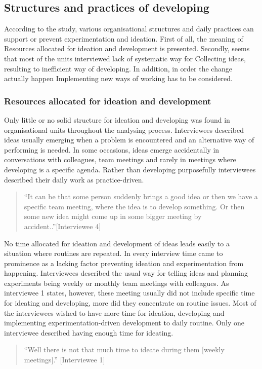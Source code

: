 \subsection{Structures and practices of developing}
According to the study, various organisational structures and daily practices can support or prevent experimentation and ideation. First of all, the meaning of Resources allocated for ideation and development is presented. Secondly, seems that most of the units interviewed lack of systematic way for Collecting ideas, resulting to inefficient way of developing. In addition, in order the change actually happen Implementing new ways of working has to be considered. 

\subsubsection{Resources allocated for ideation and development}
Only little or no solid structure for ideation and developing was found in organisational units throughout the analysing process. Interviewees described ideas usually emerging when a problem is encountered and an alternative way of performing is needed. In some occasions, ideas emerge accidentally  in conversations with colleagues, team meetings and rarely in meetings where developing is a specific agenda. Rather than developing purposefully interviewees described their daily work as practice-driven. 
\begin{quote}
``It can be that some person suddenly brings a good idea or then we have a specific team meeting, where the idea is to develop something. Or then some new idea might come up in some bigger meeting by accident..''[Interviewee 4]
\end{quote}
No time allocated for ideation and development of ideas leads easily to a situation where routines are repeated. In every interview time came to prominence as a lacking factor preventing ideation and experimentation from happening. Interviewees described the usual way for telling ideas and planning experiments being weekly or monthly team meetings with colleagues. As interviewee 1 states, however, these meeting usually did not include specific time for ideating and developing, more did they concentrate on routine issues. Most of the interviewees wished to have more time for ideation, developing and implementing experimentation-driven development to daily routine. Only one interviewee described having enough time for ideating. 
\begin{quote}
``Well there is not that much time to ideate during them [weekly meetings].'' [Interviewee 1]
\end{quote}
